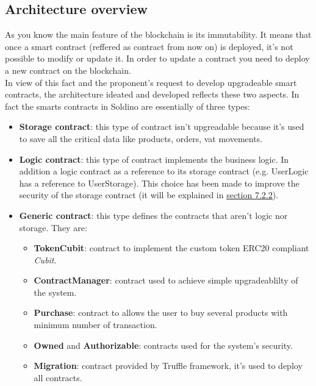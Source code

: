 \subsection{Architecture overview}
As you know the main feature of the blockchain is its immutability. It means that once a smart contract (reffered as contract from now on) is 
deployed, it's not possible to modify or update it. In order to update a contract you need to deploy 
a new contract on the blockchain.\\
In view of this fact and the proponent's request to develop upgradeable smart contracts, the architecture ideated and developed reflects these two aspects. In fact the smarts contracts in Soldino
are essentially of three types:
\begin{itemize}
	\item\textbf{Storage contract}: this type of contract isn't upgreadable because it's used
		to save all the critical data like products, orders, vat movements. 
	\item\textbf{Logic contract}: this type of contract implements the business logic. In addition
	a logic contract as a reference to its storage contract (e.g. UserLogic has a reference to UserStorage). This choice has been made to improve the security of the storage contract (it will be explained in \hyperlink{st}{\underline{section 7.2.2}}).
	\item\textbf{Generic contract}: this type defines the contracts that aren't logic nor storage.
	They are:
	\begin{itemize}
		\item\textbf{TokenCubit}: contract to implement the custom token ERC20 compliant \textit{Cubit}.
		\item\textbf{ContractManager}: contract used to achieve simple upgradeablilty of the system.
		\item\textbf{Purchase}: contract to allows the user to buy several products with minimum number of transaction.
		\item\textbf{Owned} and \textbf{Authorizable}: contracts used for the system's security.
		\item\textbf{Migration}: contract provided by Truffle framework, it's used to deploy all contracts. 
	\end{itemize}
\end{itemize}

